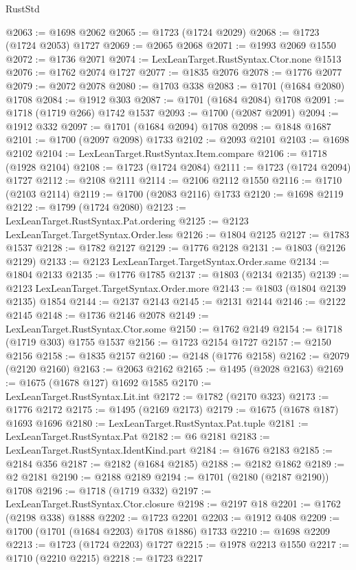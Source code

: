 \begin{lexlean}{RustStd}
\begin{coremodule}
@2063 := @1698 @2062
@2065 := @1723 (@1724 @2029)
@2068 := @1723 (@1724 @2053) @1727
@2069 := @2065 @2068
@2071 := @1993 @2069 @1550
@2072 := @1736 @2071
@2074 := LexLeanTarget.RustSyntax.Ctor.none @1513
@2076 := @1762 @2074 @1727
@2077 := @1835 @2076
@2078 := @1776 @2077
@2079 := @2072 @2078
@2080 := @1703 @338
@2083 := @1701 (@1684 @2080) @1708
@2084 := @1912 @303
@2087 := @1701 (@1684 @2084) @1708
@2091 := @1718 (@1719 @266) @1742 @1537
@2093 := @1700 (@2087 @2091)
@2094 := @1912 @332
@2097 := @1701 (@1684 @2094) @1708
@2098 := @1848 @1687
@2101 := @1700 (@2097 @2098) @1733
@2102 := @2093 @2101
@2103 := @1698 @2102
@2104 := LexLeanTarget.RustSyntax.Item.compare
@2106 := @1718 (@1928 @2104)
@2108 := @1723 (@1724 @2084)
@2111 := @1723 (@1724 @2094) @1727
@2112 := @2108 @2111
@2114 := @2106 @2112 @1550
@2116 := @1710 (@2103 @2114)
@2119 := @1700 (@2083 @2116) @1733
@2120 := @1698 @2119
@2122 := @1799 (@1724 @2080)
@2123 := LexLeanTarget.RustSyntax.Pat.ordering
@2125 := @2123 LexLeanTarget.TargetSyntax.Order.less
@2126 := @1804 @2125
@2127 := @1783 @1537
@2128 := @1782 @2127
@2129 := @1776 @2128
@2131 := @1803 (@2126 @2129)
@2133 := @2123 LexLeanTarget.TargetSyntax.Order.same
@2134 := @1804 @2133
@2135 := @1776 @1785
@2137 := @1803 (@2134 @2135)
@2139 := @2123 LexLeanTarget.TargetSyntax.Order.more
@2143 := @1803 (@1804 @2139 @2135) @1854
@2144 := @2137 @2143
@2145 := @2131 @2144
@2146 := @2122 @2145
@2148 := @1736 @2146 @2078
@2149 := LexLeanTarget.RustSyntax.Ctor.some
@2150 := @1762 @2149
@2154 := @1718 (@1719 @303) @1755 @1537
@2156 := @1723 @2154 @1727
@2157 := @2150 @2156
@2158 := @1835 @2157
@2160 := @2148 (@1776 @2158)
@2162 := @2079 (@2120 @2160)
@2163 := @2063 @2162
@2165 := @1495 (@2028 @2163)
@2169 := @1675 (@1678 @127) @1692 @1585
@2170 := LexLeanTarget.RustSyntax.Lit.int
@2172 := @1782 (@2170 @323)
@2173 := @1776 @2172
@2175 := @1495 (@2169 @2173)
@2179 := @1675 (@1678 @187) @1693 @1696
@2180 := LexLeanTarget.RustSyntax.Pat.tuple
@2181 := LexLeanTarget.RustSyntax.Pat
@2182 := @6 @2181
@2183 := LexLeanTarget.RustSyntax.IdentKind.part
@2184 := @1676 @2183
@2185 := @2184 @356
@2187 := @2182 (@1684 @2185)
@2188 := @2182 @1862
@2189 := @2 @2181
@2190 := @2188 @2189
@2194 := @1701 (@2180 (@2187 @2190)) @1708
@2196 := @1718 (@1719 @332)
@2197 := LexLeanTarget.RustSyntax.Ctor.closure
@2198 := @2197 @18
@2201 := @1762 (@2198 @338) @1888
@2202 := @1723 @2201
@2203 := @1912 @408
@2209 := @1700 (@1701 (@1684 @2203) @1708 @1886) @1733
@2210 := @1698 @2209
@2213 := @1723 (@1724 @2203) @1727
@2215 := @1978 @2213 @1550
@2217 := @1710 (@2210 @2215)
@2218 := @1723 @2217

\end{coremodule}
\end{lexlean}
